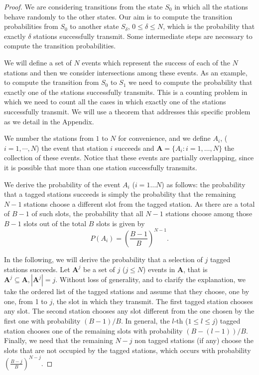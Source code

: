 \documentclass[journal]{IEEEtran}
\begin{document}
\begin{proof}
We are considering transitions from the state $S_0$ in which all the stations behave randomly to the other states. 
Our aim is to compute the transition probabilities from $S_0$ to another state $S_\delta$, $0\leq \delta \leq N$, which is the probability that exactly $\delta$ stations successfully transmit.
Some intermediate steps are necessary to compute the transition probabilities.

We will define a set of $N$ events which represent the success of each of the $N$ stations and then we consider intersections among these events.
As an example, to compute the transition from $S_0$ to $S_1$ we need to compute the probability that exactly one of the stations successfully transmits.
This is a counting problem in which we need to count all the cases in which exactly one of the stations successfully transmit.
We will use a theorem that addresses this specific problem as we detail in the Appendix.

We number the stations from $1$ to $N$ for convenience, and we define $A_i$, ($i=1,\cdots,N$) the event that station $i$ succeeds and $\mathbf{A}=\{A_i:i=1,\dots,N\}$ the collection of these events.
Notice that these events are partially overlapping, since it is possible that more than one station successfully transmits.

We derive the probability of the event $A_i$ ($i=1\dots N$) as follows:
the probability that a tagged stations succeeds is simply the probability that the remaining $N-1$ stations choose a different slot from the tagged station.
As there are a total of $B-1$ of such slots, the probability that all $N-1$ stations choose among those $B-1$ slots out of the total $B$ slots is given by
\begin{equation}
P(A_i)=\left(\frac{B-1}{B} \right)^{N-1}.
\end{equation}

In the following, we will derive the probability that a selection of $j$ tagged stations succeeds.
Let $\mathbf{A}^j$ be a set of $j$ ($j\leq N$) events in $\mathbf{A}$, that is $\mathbf{A}^j \subseteq \mathbf{A}, |\mathbf{A}^j|=j$.
Without loss of generality, and to clarify the explanation, we take the ordered list of the tagged stations and assume that they choose, one by one, from 1 to $j$, the slot in which they transmit. 
The first tagged station chooses any slot.
The second station chooses any slot different from the one chosen by the first one with probability $(B-1)/B$. 
In general, the $l$-th ($1 \leq l \leq j$) tagged station chooses one of the remaining slots with probability $(B-(l-1))/B$.
Finally, we need that the remaining $N-j$ non tagged stations (if any) choose the slots that are not occupied by the tagged stations, which occurs with probability $\left( \frac{B-j}{B}\right)^{N-j}$.


\end{proof}
\end{document}

